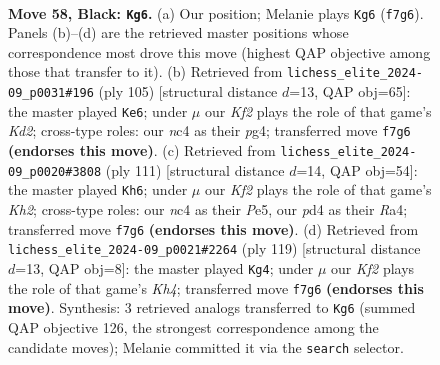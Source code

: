 \documentclass[11pt]{article}
\begin{document}
\clearpage

\begin{figure}[p]\centering
\begin{subfigure}{0.46\textwidth}\centering
\resizebox{\linewidth}{!}{%
\newchessgame
\chessboard[
  setfen={8/1R3kp1/5p2/7p/2NP3P/6P1/7K/r7 b - - 10 58},
  showmover=false,
  pgfstyle=straightmove, color=movearrow, markmove={f7-g6}
]}
\caption{}
\end{subfigure}\hfill
\begin{subfigure}{0.46\textwidth}\centering
\resizebox{\linewidth}{!}{%
\newchessgame
\chessboard[
  setfen={8/R2kp3/3p1p2/8/4P1P1/4P2r/5K2/8 b - - 20 53},
  showmover=false,
  pgfstyle=straightmove, color=movearrow, markmove={d7-e6}
]}
\caption{}
\end{subfigure}
\\[4pt]
\begin{subfigure}{0.46\textwidth}\centering
\resizebox{\linewidth}{!}{%
\newchessgame
\chessboard[
  setfen={8/1R5k/6p1/4pp1p/r6P/6P1/5K2/8 b - - 1 56},
  showmover=false,
  pgfstyle=straightmove, color=movearrow, markmove={h7-h6}
]}
\caption{}
\end{subfigure}\hfill
\begin{subfigure}{0.46\textwidth}\centering
\resizebox{\linewidth}{!}{%
\newchessgame
\chessboard[
  setfen={8/8/5R2/5ppk/4p3/4P3/5PK1/2r5 b - - 3 60},
  showmover=false,
  pgfstyle=straightmove, color=movearrow, markmove={h5-g4}
]}
\caption{}
\end{subfigure}
\caption{\textbf{Move 58, Black: \texttt{Kg6}.} (a) Our position; Melanie plays \texttt{Kg6} (\texttt{f7g6}). Panels (b)--(d) are the retrieved master positions whose correspondence most drove this move (highest QAP objective among those that transfer to it). (b) Retrieved from \texttt{lichess\_elite\_2024-09\_p0031\#196} (ply 105) [structural distance $d$=13, QAP obj=65]: the master played \texttt{Ke6}; under $\mu$ our \emph{Kf2} plays the role of that game's \emph{Kd2}; cross-type roles: our \emph{n}c4 as their \emph{p}g4; transferred move \texttt{f7g6} \textbf{(endorses this move)}. (c) Retrieved from \texttt{lichess\_elite\_2024-09\_p0020\#3808} (ply 111) [structural distance $d$=14, QAP obj=54]: the master played \texttt{Kh6}; under $\mu$ our \emph{Kf2} plays the role of that game's \emph{Kh2}; cross-type roles: our \emph{n}c4 as their \emph{P}e5, our \emph{p}d4 as their \emph{R}a4; transferred move \texttt{f7g6} \textbf{(endorses this move)}. (d) Retrieved from \texttt{lichess\_elite\_2024-09\_p0021\#2264} (ply 119) [structural distance $d$=13, QAP obj=8]: the master played \texttt{Kg4}; under $\mu$ our \emph{Kf2} plays the role of that game's \emph{Kh4}; transferred move \texttt{f7g6} \textbf{(endorses this move)}. Synthesis: 3 retrieved analogs transferred to \texttt{Kg6} (summed QAP objective 126, the strongest correspondence among the candidate moves); Melanie committed it via the \texttt{search} selector.}
\label{fig:thought-m115}
\end{figure}
\end{document}
